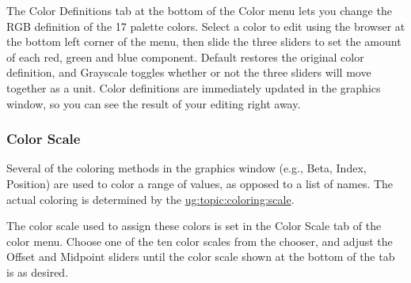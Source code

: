 The {\sf Color Definitions} tab at the bottom of the Color menu lets
you change the RGB definition of the 17 palette colors.  Select a color
to edit using the browser at the bottom left corner of the menu, then
slide the three sliders to set the amount of each red, green and blue
component.  {\sf Default} restores the original color definition, and
{\sf Grayscale} toggles whether or not the three sliders will move 
together as a unit.  Color definitions are immediately updated in the
graphics window, so you can see the result of your editing right away.

\subsubsection{Color Scale}
\label{ug:ui:window:color:scale}

Several of the coloring methods in the graphics window (e.g., Beta, 
Index, Position) are used to color
a range of values, as opposed to a list of names.  The actual
coloring is determined by the  \hyperref{color
scale}{color scale [\S }{]}{ug:topic:coloring:scale}.

The color scale used to assign these colors is set in the {\sf Color Scale}
tab of the color menu.  Choose one of the ten color scales from the
chooser, and adjust the {\sf Offset} and {\sf Midpoint} sliders until
the color scale shown at the bottom of the tab is as desired.  

